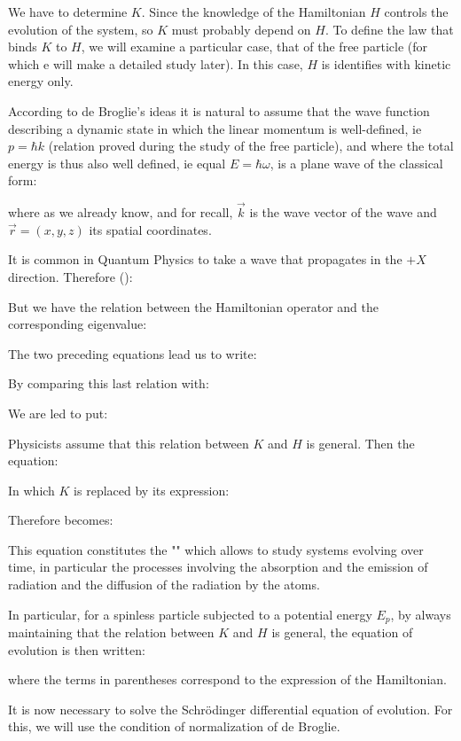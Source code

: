 	We have to determine $K$. Since the knowledge of the Hamiltonian $H$ controls the evolution of the system, so $K$ must probably depend on $H$. To define the law that binds $K$ to $H$, we will examine a particular case, that of the free particle (for which e will make a detailed study later). In this case, $H$ is identifies with kinetic energy only.
	
	According to de Broglie's ideas it is natural to assume that the wave function describing a dynamic state in which the linear momentum is well-defined, ie $p=\hbar k$ (relation proved during the study of the free particle), and where the total energy is thus also well defined, ie equal $E=\hbar\omega$, is a plane wave of the classical form:
	
	where as we already know, and for recall, $\vec{k}$ is the wave vector of the wave and $\vec{r}=(x,y,z)$ its spatial coordinates.
	
	It is common in Quantum Physics to take a wave that propagates in the $+X$ direction. Therefore ():
	
	But we have the relation between the Hamiltonian operator and the corresponding eigenvalue:
	
	The two preceding equations lead us to write:
	
	By comparing this last relation with:
	
	We are led to put:
	
	Physicists assume that this relation between $K$ and $H$ is general. Then the equation:
	
	In which $K$ is replaced by its expression:
	
	Therefore becomes:
	
	This equation constitutes the "" which allows to study systems evolving over time, in particular the processes involving the absorption and the emission of radiation and the diffusion of the radiation by the atoms.
	
	In particular, for a spinless particle subjected to a potential energy $E_p$, by always maintaining that the relation between $K$ and $H$ is general, the equation of evolution is then written:
	
	where the terms in parentheses correspond to the expression of the Hamiltonian.

	It is now necessary to solve the Schrödinger differential equation of evolution. For this, we will use the condition of normalization of de Broglie.


